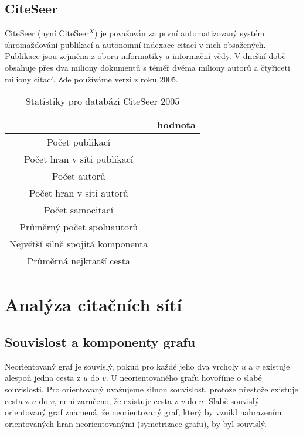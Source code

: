 \documentclass[12pt,titlepage]{report}
\begin{document}
\subsection{CiteSeer}
CiteSeer (nyní CiteSeer$^X$) \cite{citeseer} je považován za první
automatizovaný systém shromažďování publikací a autonomní indexace citací v
nich obsažených. Publikace jsou zejména z oboru informatiky a informační vědy.
V dnešní době obsahuje přes dva miliony dokumentů s téměř dvěma miliony autorů
a čtyřiceti miliony citací. Zde používáme verzi z roku 2005.

\begin{table}[!ht]
\begin{center}
\begin{tabular}{c|c}
\toprule
& hodnota \\
\midrule
Počet publikací & \\
Počet hran v síti publikací & \\
Počet autorů &  \\
Počet hran v síti autorů &  \\
Počet samocitací &  \\
Průměrný počet spoluautorů & \\
Největší silně spojitá komponenta & \\
Průměrná nejkratší cesta & \\
\bottomrule
\end{tabular}
\caption{Statistiky pro databázi CiteSeer 2005}
\label{tab:dblpstat}
\end{center}
\end{table}





\section{Analýza citačních sítí}
\subsection{Souvislost a komponenty grafu}
Neorientovaný graf je souvislý, pokud pro každé jeho dva vrcholy $u$ a $v$
existuje alespoň jedna cesta z $u$ do $v$. U neorientovaného grafu hovoříme o
slabé souvislosti. Pro orientovaný uvažujeme silnou souvislost, protože
přestože existuje cesta z $u$ do $v$, není zaručeno, že existuje cesta z $v$ do
$u$.  Slabě souvislý orientovaný graf znamená, že neorientovaný graf, který by
vznikl nahrazením orientovaných hran neorientovanými (symetrizace grafu), by
byl souvislý.
\end{document}
